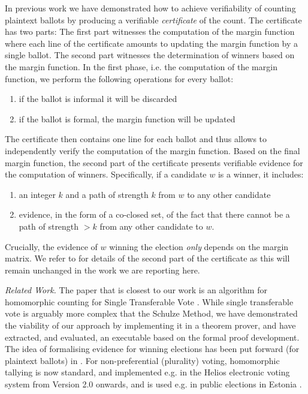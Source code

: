 \documentclass{llncs}
\begin{document}
  In previous work \cite{Pattinson:2017:SVE} we have demonstrated
  how to achieve verifiability of counting plaintext ballots by
  producing a verifiable \emph{certificate} of the count. The
  certificate has two parts: The first part witnesses the
  computation of the margin function where each line of the
  certificate amounts to updating the margin function by a single
  ballot. The second part witnesses the determination of winners
  based on the margin function. In the first phase, i.e. the
  computation of the margin function, we perform the following
  operations for every ballot:
  \begin{enumerate}
    \item if the ballot is informal it will be discarded
    \item if the ballot is formal, the margin function will be
    updated
  \end{enumerate}
  The certificate then contains one line for each ballot and thus
  allows to independently verify the computation of the margin
  function. Based on the final margin function, the second part of
  the certificate presents verifiable evidence for the computation
  of winners. Specifically, if a candidate $w$ is a winner, it
  includes:
  \begin{enumerate}
    \item an integer $k$ and a path of strength $k$ from $w$ to any
    other candidate
    \item evidence, in the form of a co-closed set, of the fact that
    there cannot be a path of strength $> k$ from any other
    candidate to $w$.
  \end{enumerate}
  Crucially, the evidence of $w$ winning the election \emph{only}
  depends on the margin matrix. 
  We refer to \cite{Pattinson:2017:SVE} for details of the second
  part of the certificate as this will remain unchanged in the work
  we are reporting here.
    
   
\smallskip\noindent\emph{Related Work.} The paper that is closest to
our work is an algorithm for homomorphic counting for Single
Transferable Vote \cite{Benaloh:2009:SSC}. While single transferable
vote is arguably more complex that the Schulze Method, we have
demonstrated the viability of our approach by implementing it in a
theorem prover, and have extracted, and evaluated, an executable
based on the formal proof development. The idea of formalising
evidence for winning elections has been put forward (for plaintext
ballots) in \cite{Pattinson:2015:VCM}. For non-preferential
(plurality) voting, homomorphic tallying is now standard, and
implemented e.g. in the Helios electronic voting system
\cite{deMarneffe:2009:EUP} from Version 2.0 onwards, and is used
e.g. in public elections in Estonia \cite{Parsovs:2016:HTE}.
\end{document}
